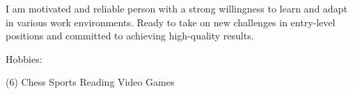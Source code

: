
\begin{cvparagraph}
I am motivated and reliable person with a strong willingness to learn and adapt in various work environments.
Ready to take on new challenges in entry-level positions and committed to achieving high-quality results.



Hobbies:
\begin{tasks}[style=itemize, column-sep=-35mm, label-align=center, label-offset={0mm}, label-width={3mm}, item-indent={40mm}](6)%
\task Chess
\task Sports
\task Reading 
\task Video Games

\end{tasks}
\end{cvparagraph}
